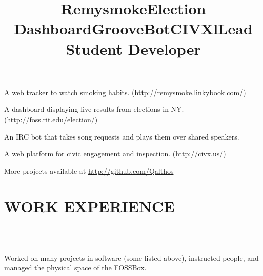 \documentclass[line]{res}
\begin{document}
\begin{resume}
    \title{Remysmoke}
    \begin{position}
        A web tracker to watch smoking habits.
        (\url{http://remysmoke.linkybook.com/})
    \end{position}

    \title{Election Dashboard}
    \begin{position}
        A dashboard displaying live results from elections in NY.
        (\url{http://foss.rit.edu/election/})
    \end{position}

    \title{GrooveBot}
    \begin{position}
        An IRC bot that takes song requests and plays them over shared speakers.
    \end{position}

    \title{CIVX}
    \begin{position}
        A web platform for civic engagement and inspection.
        (\url{http://civx.us/})
    \end{position}

    More projects available at \url{http://github.com/Qalthos}

\section{WORK EXPERIENCE}
    \begin{format}
        \title{l}\\
        \\
        \body
    \end{format}

    \title{Lead Student Developer}
    \begin{position}
        Worked on many projects in software (some listed above), instructed
        people, and managed the physical space of the FOSSBox.
    \end{position}


\end{resume}
\end{document}
